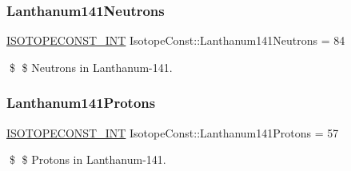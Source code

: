 \subsubsection{\texorpdfstring{Lanthanum141\+Neutrons}{Lanthanum141Neutrons}}
{\footnotesize\ttfamily \mbox{\hyperlink{group___isotope_const-_macros_ga5f18360b3e99483a35c32d789e62621c}{I\+S\+O\+T\+O\+P\+E\+C\+O\+N\+S\+T\+\_\+\+I\+NT}} Isotope\+Const\+::\+Lanthanum141\+Neutrons = 84}

\$ \$ Neutrons in Lanthanum-\/141. \mbox{\label{group___isotope_const-_lanthanum-_la141_ga071fd64ad77a82f4d55c700b93b1821c}} 
\subsubsection{\texorpdfstring{Lanthanum141\+Protons}{Lanthanum141Protons}}
{\footnotesize\ttfamily \mbox{\hyperlink{group___isotope_const-_macros_ga5f18360b3e99483a35c32d789e62621c}{I\+S\+O\+T\+O\+P\+E\+C\+O\+N\+S\+T\+\_\+\+I\+NT}} Isotope\+Const\+::\+Lanthanum141\+Protons = 57}

\$ \$ Protons in Lanthanum-\/141. 